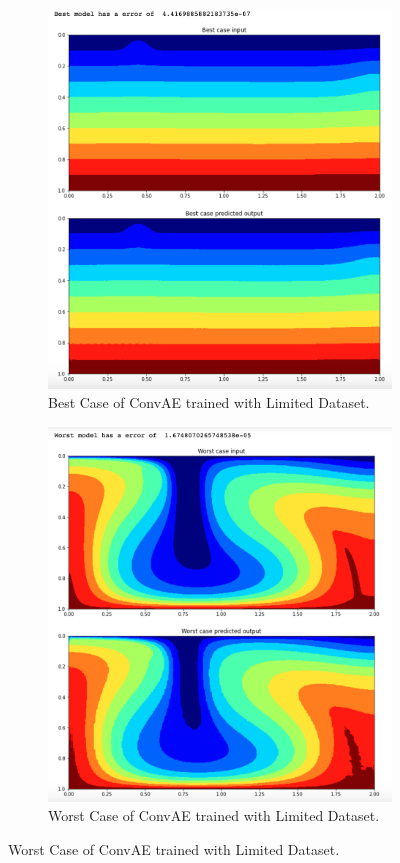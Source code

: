 \begin{figure}[H]
\centering
\begin{subfigure}{0.45\textwidth}
    \includegraphics[width=\textwidth]{figures/mantle_convection_images/limited_dataset/ConvAE_Best.png}
    \caption{Best Case of ConvAE trained with Limited Dataset.}
\end{subfigure}
\hfill
\begin{subfigure}{0.45\textwidth}
    \includegraphics[width=\textwidth]{figures/mantle_convection_images/limited_dataset/ConvAE_Worst.png}
    \caption{Worst Case of ConvAE trained with Limited Dataset.}
\end{subfigure}
        

\end{figure}
